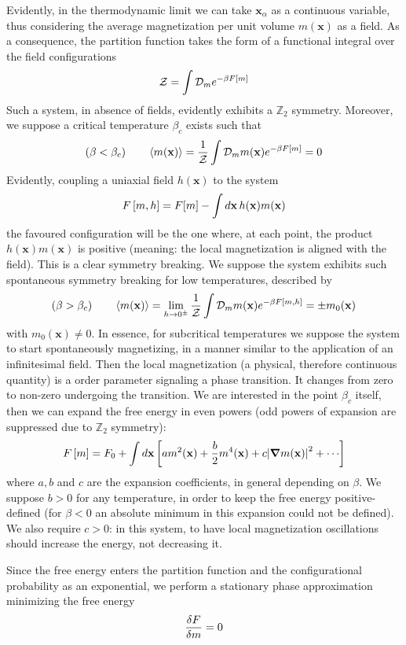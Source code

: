 Evidently, in the thermodynamic limit we can take $\mathbf{x}_\alpha$ as a continuous variable, thus considering the average magnetization per unit volume $m(\mathbf{x})$ as a field. As a consequence, the partition function takes the form of a functional integral over the field configurations
\[
    \mathcal{Z} = \int \mathcal{D}_m e^{-\beta F \left[{m}\right]}
\]
Such a system, in absence of fields, evidently exhibits a $\mathbb{Z}_2$ symmetry. Moreover, we suppose a critical temperature $\beta_c$ exists such that
\[
    (\beta < \beta_c)
    \qquad
    \ev{m(\mathbf{x})} = \frac{1}{\mathcal{Z}} \int \mathcal{D}_m m(\mathbf{x}) e^{-\beta F \lrS{m}} = 0
\]
Evidently, coupling a uniaxial field $h(\mathbf{x})$ to the system
\[
    F\left[{m,h}\right] = F[m] - \int d\mathbf{x} \, h (\mathbf{x}) m (\mathbf{x})
\]
the favoured configuration will be the one where, at each point, the product $h (\mathbf{x}) m (\mathbf{x})$ is positive (meaning: the local magnetization is aligned with the field). This is a clear symmetry breaking. We suppose the system exhibits such spontaneous symmetry breaking for low temperatures, described by
\[
    (\beta > \beta_c)
    \qquad
    \ev{m(\mathbf{x})} = \lim_{h \to 0^\pm} \frac{1}{\mathcal{Z}} \int \mathcal{D}_m m(\mathbf{x}) e^{-\beta F \lrS{m,h}} = \pm m_0 (\mathbf{x})
\]
with $m_0(\mathbf{x}) \neq 0$. In essence, for subcritical temperatures we suppose the system to start spontaneously magnetizing, in a manner similar to the application of an infinitesimal field. Then the local magnetization (a physical, therefore continuous quantity) is a order parameter signaling a phase transition. It changes from zero to non-zero undergoing the transition. We are interested in the point $\beta_c$ itself, then we can expand the free energy in even powers (odd powers of expansion are suppressed due to $\mathbb{Z}_2$ symmetry):
\[ 
    F\left[{m}\right] = F_0 + \int d\mathbf{x} \left[{
        a m^2 (\mathbf{x}) + \frac{b}{2} m^4 (\mathbf{x}) + c \abs{\grad m(\mathbf{x})}^2 + \cdots
    }\right]
\]
where $a,b$ and $c$ are the expansion coefficients, in general depending on $\beta$. We suppose $b > 0$ for any temperature, in order to keep the free energy positive-defined (for $\beta < 0$ an absolute minimum in this expansion could not be defined). We also require $c>0$: in this system, to have local magnetization oscillations should increase the energy, not decreasing it.

Since the free energy enters the partition function and the configurational probability as an exponential, we perform a stationary phase approximation minimizing the free energy
\[
    \fdv{F}{m} = 0
\]

